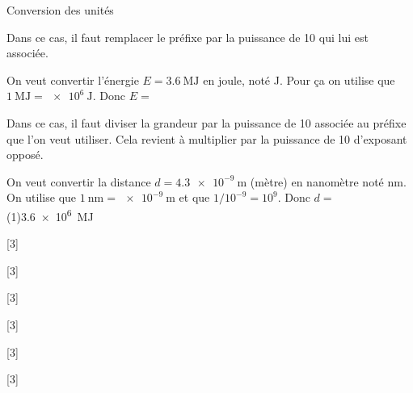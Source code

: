 \begin{doc}{Conversion des unités}

  Dans ce cas, il faut remplacer le préfixe par la puissance de 10 qui lui est associée.
  
  \exemple On veut convertir l'énergie $E = \qty{3,6}{\mega\joule}$ en joule, noté \unit{\joule}.
  Pour ça on utilise que $\qty{1}{\mega\joule} = \qty{e6}{\joule}$.
  Donc $E =$ 

  \bigskip

  Dans ce cas, il faut diviser la grandeur par la puissance de 10 associée au préfixe que l'on veut utiliser.
  Cela revient à multiplier par la puissance de 10 d'exposant opposé.

  \exemple On veut convertir la distance $d = \qty{4,3e-9}{\m}$ (mètre) en nanomètre noté \unit{nm}.
  On utilise que $\qty{1}{\nano\m} = \qty{e-9}{\m}$ et que $1 / 10^{-9} = 10^9$. 
  Donc $d = $ \texteTrou(1){\qty{3,6e6}{\mega\joule}}
\end{doc}

[3]

[3]

[3]

[3]

[3]

[3]